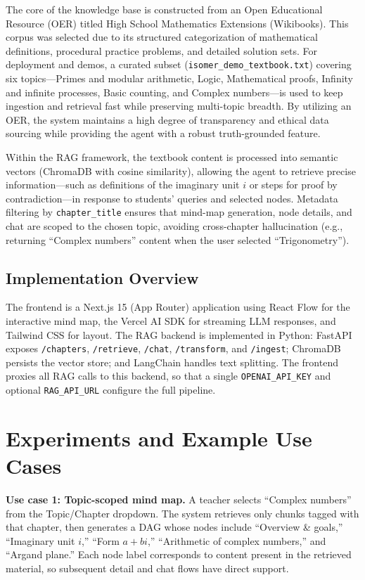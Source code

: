 \documentclass[sigplan,screen]{acmart}
\begin{document}
The core of the knowledge base is constructed from an Open Educational Resource (OER) titled High School Mathematics Extensions (Wikibooks). This corpus was selected due to its structured categorization of mathematical definitions, procedural practice problems, and detailed solution sets. For deployment and demos, a curated subset (\texttt{isomer\_demo\_textbook.txt}) covering six topics---Primes and modular arithmetic, Logic, Mathematical proofs, Infinity and infinite processes, Basic counting, and Complex numbers---is used to keep ingestion and retrieval fast while preserving multi-topic breadth. By utilizing an OER, the system maintains a high degree of transparency and ethical data sourcing while providing the agent with a robust truth-grounded feature.

Within the RAG framework, the textbook content is processed into semantic vectors (ChromaDB with cosine similarity), allowing the agent to retrieve precise information---such as definitions of the imaginary unit $i$ or steps for proof by contradiction---in response to students' queries and selected nodes. Metadata filtering by \texttt{chapter\_title} ensures that mind-map generation, node details, and chat are scoped to the chosen topic, avoiding cross-chapter hallucination (e.g., returning ``Complex numbers'' content when the user selected ``Trigonometry'').

\subsection{Implementation Overview}
The frontend is a Next.js 15 (App Router) application using React Flow for the interactive mind map, the Vercel AI SDK for streaming LLM responses, and Tailwind CSS for layout. The RAG backend is implemented in Python: FastAPI exposes \texttt{/chapters}, \texttt{/retrieve}, \texttt{/chat}, \texttt{/transform}, and \texttt{/ingest}; ChromaDB persists the vector store; and LangChain handles text splitting. The frontend proxies all RAG calls to this backend, so that a single \texttt{OPENAI\_API\_KEY} and optional \texttt{RAG\_API\_URL} configure the full pipeline.

\section{Experiments and Example Use Cases}

\textbf{Use case 1: Topic-scoped mind map.} A teacher selects ``Complex numbers'' from the Topic/Chapter dropdown. The system retrieves only chunks tagged with that chapter, then generates a DAG whose nodes include ``Overview \& goals,'' ``Imaginary unit $i$,'' ``Form $a+bi$,'' ``Arithmetic of complex numbers,'' and ``Argand plane.'' Each node label corresponds to content present in the retrieved material, so subsequent detail and chat flows have direct support.
\end{document}
